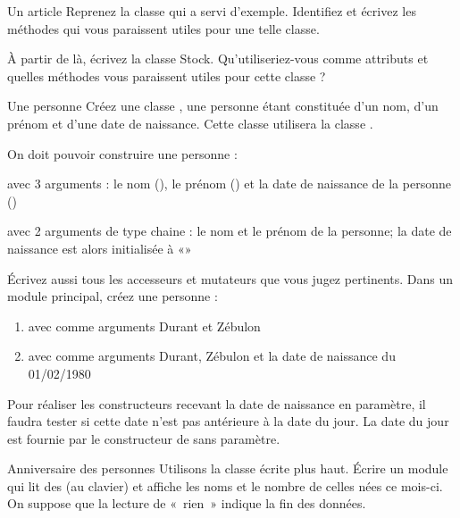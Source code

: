 \begin{Exercice}{Un article}
	Reprenez la classe  qui a servi
	d'exemple. Identifiez et écrivez les méthodes qui vous
	paraissent utiles pour une telle classe.
	
	À partir de là, écrivez la classe Stock. Qu'utiliseriez-vous 
	comme attributs et quelles méthodes vous paraissent utiles pour
	cette classe ?
\end{Exercice}

\begin{Exercice}{Une personne}
	Créez une classe , une personne étant
	constituée d'un nom, d'un prénom et
	d'une date de naissance. Cette classe utilisera la
	classe .

	On doit pouvoir construire une personne :

	\begin{liste}
		\item 
			avec 3 arguments : le nom (), le prénom
			() et la date de naissance de la personne
			()
		\item 
			avec 2 arguments de type chaine : le nom et le prénom de la personne; la
			date de naissance est alors initialisée à «»
	\end{liste}

	Écrivez aussi tous les accesseurs et mutateurs que vous jugez
	pertinents. Dans un module principal, créez une personne :

	\begin{enumerate}[label=\alph*)]
		\item 
			avec comme arguments {\textquotedbl}Durant{\textquotedbl} et
			{\textquotedbl}Zébulon{\textquotedbl}
		\item 
			avec comme arguments {\textquotedbl}Durant{\textquotedbl},
			{\textquotedbl}Zébulon{\textquotedbl} et la date de naissance du
			01/02/1980
	\end{enumerate}

	Pour réaliser les constructeurs recevant la date de naissance en
	paramètre, il faudra tester si cette date n’est pas antérieure à la
	date du jour. La date du jour est fournie par le constructeur de
	 sans paramètre.
\end{Exercice}

\begin{Exercice}{Anniversaire des personnes}
	Utilisons la classe  écrite plus haut.
	Écrire un module qui lit des  (au clavier)
	et affiche les noms et le nombre de celles nées ce mois-ci. On suppose
	que la lecture de «~rien~» indique la fin des données.
\end{Exercice}

